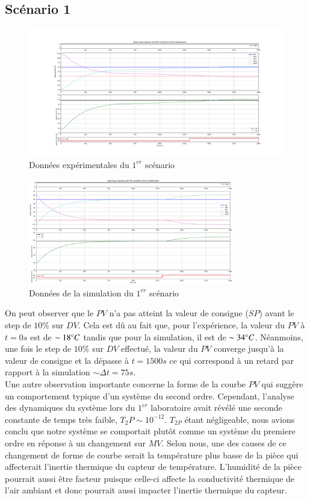 \subsection{Scénario 1}
\begin{figure}[H]
	\centering
	\includegraphics[width=1\textwidth]{../Plots/Experiment_scenario_2_2024-03-30-20h20.pdf}
	\caption{Données expérimentales du $1^{er}$ scénario}
	\label{fig:exp_scenario1}
\end{figure}
\begin{figure}[H]
	\centering
	\includegraphics[width=0.8\textwidth]{figures/scenario2.png}
	\caption{Données de la simulation du $1^{er}$ scénario}
	\label{fig:sim_scenario1}
\end{figure}

On peut observer que le $PV$ n'a pas atteint la valeur de consigne ($SP$) avant le step de $10\%$ sur $DV$. Cela est dû au fait que, pour l'expérience,
la valeur du $PV$ à $t = 0s$ est de $\sim 18\degree C$ tandis que pour la simulation, il est de $\sim 34\degree C$. Néanmoins, une fois le step de $10\%$ sur $DV$ effectué,
la valeur du $PV$ converge jusqu'à la valeur de consigne et la dépasse à $t = 1500s$ ce qui correspond à un retard par rapport à la simulation $\sim \Delta t = 75s$. 
\\Une autre observation importante concerne la forme de la courbe $PV$ qui suggère un comportement typique d'un système du second ordre. Cependant, l'analyse des dynamiques du système 
lors du $1^{er}$ laboratoire avait révélé une seconde constante de temps très faible, $T_2P \sim 10^{-12}$. $T_{2P}$ étant négligeable, nous avions conclu que notre système se comportait
plutôt comme un système du premiere ordre en réponse à un changement sur $MV$. Selon nous, une des causes de ce changement de forme de courbe serait la température plus basse de la pièce qui affecterait 
l'inertie thermique du capteur de température. L'humidité de la pièce pourrait aussi être facteur puisque celle-ci affecte la conductivité thermique de l'air 
ambiant et donc pourrait aussi impacter l'inertie thermique du capteur.

